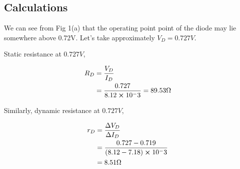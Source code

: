 \subsection{Calculations}
We can see from Fig 1(a) that the operating point point of the diode may lie somewhere above 0.72V. Let's take approximately $V_D = 0.727V$. 

Static resistance at $0.727V$,

\begin{align*}
    R_D &= \frac{V_D}{I_D}\\
    &= \frac{0.727}{8.12\cross10^-3} = 89.53\Omega
\end{align*}


Similarly, dynamic resistance at $0.727V$,

\begin{align*}
    r_D &= \frac{\Delta V_D}{\Delta I_D}\\
    &= \frac{0.727-0.719}{(8.12-7.18)\cross10^-3} \\
    &=8.51 \Omega
\end{align*}

